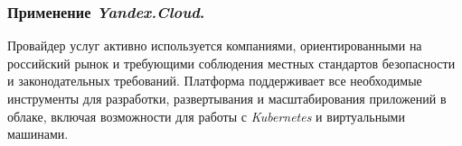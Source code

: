 \subsubsection{Применение \textit{Yandex.Cloud}.}
Провайдер услуг активно используется компаниями, ориентированными на российский рынок и требующими соблюдения местных стандартов безопасности и законодательных требований. Платформа поддерживает все необходимые инструменты для разработки, развертывания и масштабирования приложений в облаке, включая возможности для работы с \textit{Kubernetes} и виртуальными машинами.
